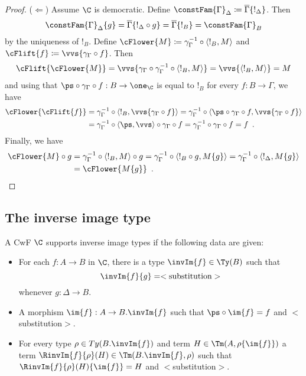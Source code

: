 \documentclass{article}
\begin{document}
\begin{proof}
  ($\Leftarrow$) Assume $\C$ is democratic. Define
  $\constFam{\Gamma}_{\Delta} \coloneqq
  \overline{\Gamma}\{!_{\Delta}\}$. Then
  \[\constFam{\Gamma}_{\Delta}\{g\} = \overline{\Gamma}\{!_{\Delta}
  \circ g\} = \overline{\Gamma}\{!_{B}\} = \constFam{\Gamma}_{B}\] by
  the uniqueness of $!_{B}$. Define $\cFlower{M} \coloneqq
  \gamma_{\Gamma}^{-1} \circ \langle !_{B}, M\rangle$ and $\cFlift{f}
  \coloneqq \vvs\{\gamma_{\Gamma} \circ f\}$. Then
  \begin{align*}
    \cFlift{\cFlower{M}}
  = \vvs\{\gamma_{\Gamma} \circ \gamma_{\Gamma}^{-1} \circ \langle !_{B}, M\rangle\}
  = \vvs\{\langle !_{B}, M\rangle\}
  = M
  \end{align*}
  and using that $\ps \circ \gamma_{\Gamma} \circ f : B \to \one_{\C}$
  is equal to $!_{B}$ for every $f : B \to \Gamma$, we have
  \begin{align*}
    \cFlower{\cFlift{f}}
  &= \gamma_{\Gamma}^{-1} \circ \langle !_{B}, \vvs\{\gamma_{\Gamma} \circ f\}\rangle
   = \gamma_{\Gamma}^{-1} \circ \langle \ps \circ \gamma_{\Gamma} \circ f, \vvs\{\gamma_{\Gamma} \circ f\}\rangle \\
  &= \gamma_{\Gamma}^{-1} \circ \langle \ps, \vvs\rangle \circ \gamma_{\Gamma} \circ f 
   = \gamma_{\Gamma}^{-1} \circ \gamma_{\Gamma} \circ f 
   = f \enspace .
  \end{align*}
Finally, we have
\begin{align*}
    \cFlower{M} \circ g
  &= \gamma_{\Gamma}^{-1} \circ \langle !_{B}, M\rangle \circ g
   = \gamma_{\Gamma}^{-1} \circ \langle !_{B} \circ g, M\{g\}\rangle  
   = \gamma_{\Gamma}^{-1} \circ \langle !_{\Delta}, M\{g\}\rangle \\
  &= \cFlower{M\{g\}} \enspace .
\end{align*}

\end{proof}


\subsection{The inverse image type}

\begin{definition}
  A CwF $\C$ supports inverse image types if the following data are given:
  \begin{itemize}
  \item For each $f : A \to B$ in $\C$, there is a type $\invIm{f} \in
    \Ty(B)$ such that
    \[
    \invIm{f}\{g\} = <\text{substitution}>
    \]
    whenever $g : \Delta \to B$.
  \item A morphism $\im{f} : A \to B.\invIm{f}$ such that $\ps \circ
    \im{f} = f$ and $<$substitution$>$.
  \item For every type $\rho \in Ty(B.\invIm{f})$ and term $H \in
    \Tm(A, \rho\{\im{f}\})$ a term $\RinvIm{f}{\rho}(H) \in
    \Tm(B.\invIm{f}, \rho)$ such that $\RinvIm{f}{\rho}(H)\{\im{f}\} = H$ and
    $<$substitution$>$.
  \end{itemize}
\end{definition}
\end{document}
